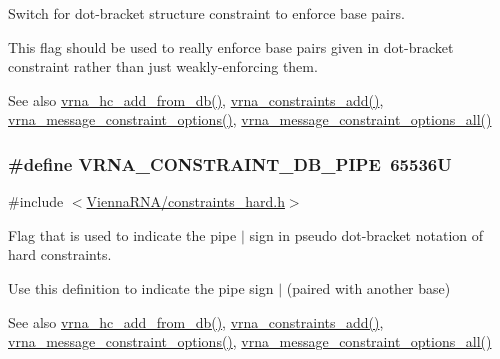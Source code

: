 Switch for dot-\/bracket structure constraint to enforce base pairs. 

This flag should be used to really enforce base pairs given in dot-\/bracket constraint rather than just weakly-\/enforcing them.

\begin{DoxySeeAlso}{See also}
\hyperlink{group__hard__constraints_ga5b4de3247b67358080c176b94591a8e6}{vrna\+\_\+hc\+\_\+add\+\_\+from\+\_\+db()}, \hyperlink{group__constraints_ga35a401f680969a556858a8dd5f1d07cc}{vrna\+\_\+constraints\+\_\+add()}, \hyperlink{group__constraints_gaa1f20b53bf09ac2e6b0dbb13f7d89670}{vrna\+\_\+message\+\_\+constraint\+\_\+options()}, \hyperlink{group__constraints_gaec7e13fa0465c2acc7a621d1aecb709f}{vrna\+\_\+message\+\_\+constraint\+\_\+options\+\_\+all()} 
\end{DoxySeeAlso}
\subsubsection[{\texorpdfstring{V\+R\+N\+A\+\_\+\+C\+O\+N\+S\+T\+R\+A\+I\+N\+T\+\_\+\+D\+B\+\_\+\+P\+I\+PE}{VRNA_CONSTRAINT_DB_PIPE}}]{\setlength{\rightskip}{0pt plus 5cm}\#define V\+R\+N\+A\+\_\+\+C\+O\+N\+S\+T\+R\+A\+I\+N\+T\+\_\+\+D\+B\+\_\+\+P\+I\+PE~65536U}\hypertarget{group__hard__constraints_ga13053547a2de5532b64b64d35e097ae1}{}\label{group__hard__constraints_ga13053547a2de5532b64b64d35e097ae1}


{\ttfamily \#include $<$\hyperlink{constraints__hard_8h}{Vienna\+R\+N\+A/constraints\+\_\+hard.\+h}$>$}



Flag that is used to indicate the pipe \textquotesingle{}$\vert$\textquotesingle{} sign in pseudo dot-\/bracket notation of hard constraints. 

Use this definition to indicate the pipe sign \textquotesingle{}$\vert$\textquotesingle{} (paired with another base)

\begin{DoxySeeAlso}{See also}
\hyperlink{group__hard__constraints_ga5b4de3247b67358080c176b94591a8e6}{vrna\+\_\+hc\+\_\+add\+\_\+from\+\_\+db()}, \hyperlink{group__constraints_ga35a401f680969a556858a8dd5f1d07cc}{vrna\+\_\+constraints\+\_\+add()}, \hyperlink{group__constraints_gaa1f20b53bf09ac2e6b0dbb13f7d89670}{vrna\+\_\+message\+\_\+constraint\+\_\+options()}, \hyperlink{group__constraints_gaec7e13fa0465c2acc7a621d1aecb709f}{vrna\+\_\+message\+\_\+constraint\+\_\+options\+\_\+all()} 
\end{DoxySeeAlso}
